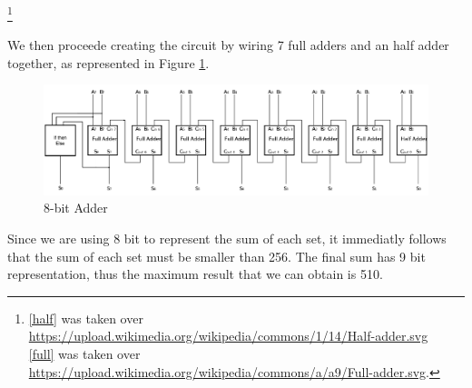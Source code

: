 \documentclass[12pt]{article}
\begin{document}
\footnote{\ref{half} was taken over \url{https://upload.wikimedia.org/wikipedia/commons/1/14/Half-adder.svg}\\ 
\ref{full} was taken over \url{https://upload.wikimedia.org/wikipedia/commons/a/a9/Full-adder.svg}.}

We then proceede creating the circuit by wiring 7 full adders and an half adder together, as represented in Figure \ref{circuit}.

\begin{figure}[!h]
    \centering
    \includegraphics[width=0.95\linewidth]{../src/images/Circuit.png}
    \caption{8-bit Adder}\label{circuit}
\end{figure}
Since we are using 8 bit to represent the sum of each set, it immediatly follows that the sum of each set must be smaller than 256. The final sum has 9 bit representation, thus the maximum result that we can obtain is 510.
\end{document}
